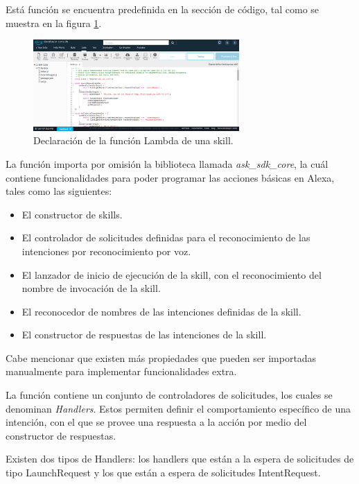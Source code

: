 Está función se encuentra predefinida en la sección de código, tal como se muestra en la figura \ref{fig:411}.

\begin{figure}
  \centering
  \includegraphics[width=0.70\textwidth]{Cap4/Figuras/Funcionlambda.png}
  \caption{Declaración de la función Lambda de una skill.}
  \label{fig:411}
\end{figure}

La función importa por omisión la biblioteca llamada \textit{ask\_sdk\_core}, la cuál contiene funcionalidades para poder programar las acciones básicas en Alexa, tales como las siguientes:

\begin{itemize}
  \item El constructor de skills.
  \item El controlador de solicitudes definidas para el reconocimiento de las intenciones por reconocimiento por voz.
  \item El lanzador de inicio de ejecución de la skill, con el reconocimiento del nombre de invocación de la skill.
  \item El reconocedor de nombres de las intenciones definidas de la skill.
  \item El constructor de respuestas de las intenciones de la skill.
\end{itemize}

Cabe mencionar que existen más propiedades que pueden ser importadas manualmente para implementar funcionalidades extra.

La función contiene un conjunto de controladores de solicitudes, los cuales se denominan \textit{Handlers}. Estos permiten definir el comportamiento específico de una intención, con el que se provee una respuesta a la acción por medio del constructor de respuestas.

Existen dos tipos de Handlers: los handlers que están a la espera de solicitudes de tipo LaunchRequest y los que están a espera de solicitudes IntentRequest.

